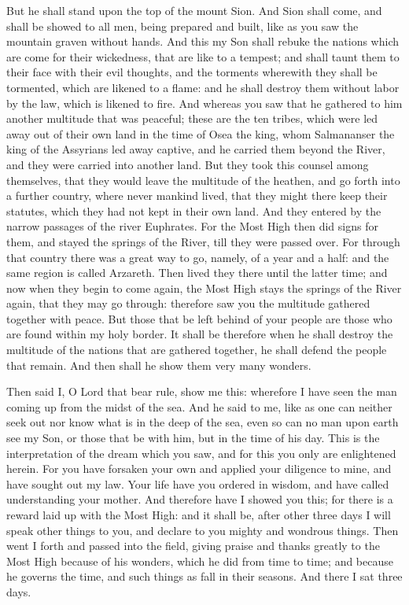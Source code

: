 {But he shall stand upon the top of the mount Sion.
And Sion shall come, and shall be showed to all men, being prepared and built, like as you saw the mountain graven without hands.
And this my Son shall rebuke the nations which are come for their wickedness,
{} that are like to a tempest;
and shall taunt them to their face with their evil thoughts, and the torments wherewith they shall be tormented, which are likened to a flame: and he shall destroy them without labor by the law, which is likened to fire.
And whereas you saw that he gathered to him another multitude that was peaceful;
these are the ten tribes, which were led away out of their own land in the time of Osea the king, whom Salmananser the king of the Assyrians led away captive, and he carried them beyond the River, and they were carried into another land.
But they took this counsel among themselves, that they would leave the multitude of the heathen, and go forth into a further country, where never mankind lived,
that they might there keep their statutes, which they had not kept in their own land.
And they entered by the narrow passages of the river Euphrates.
For the Most High then did signs for them, and stayed the springs of the River, till they were passed over.
For through that country there was a great way to go, namely, of a year and a half: and the same region is called
 Arzareth.
Then lived they there until the latter time; and now when they begin to come again,
the Most High stays the springs of the River again, that they may go through: therefore saw you the multitude gathered together with peace.
But those that be left behind of your people are those who are found within my holy border.
It shall be therefore when he shall destroy the multitude of the nations that are gathered together, he shall defend the people that remain.
And then shall he show them very many wonders.
\par }{\PP {}Then said I, O Lord that bear rule, show me this: wherefore I have seen the man coming up from the midst of the sea.
And he said to me, like as one can neither seek out nor know what is in the deep of the sea, even so can no man upon earth see my Son, or those that be with him, but in the time of
 his day.
This is the interpretation of the dream which you saw, and for this you only are enlightened herein.
For you have forsaken your own
{} and applied your diligence to mine, and have sought out my law.
Your life have you ordered in wisdom, and have called understanding your mother.
And therefore have I showed you this; for there is a reward laid up with the Most High: and it shall be, after other three days I will speak other things to you, and declare to you mighty and wondrous things.
Then went I forth and passed into the field, giving praise and thanks greatly to the Most High because of his wonders, which he did from time to time;
and because he governs the time, and such things as fall in their seasons. And there I sat three days.

}
